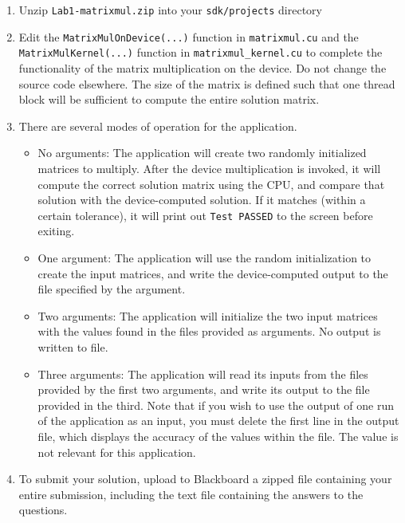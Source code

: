 \documentclass[11pt,oneside]{article}
\begin{document}
\begin{enumerate}

\item Unzip \texttt{Lab1-matrixmul.zip} into your \texttt{sdk/projects} directory


\item Edit the \texttt{MatrixMulOnDevice(...)} function in \texttt{matrixmul.cu} and the \texttt{MatrixMulKernel(...)} function in \texttt{matrixmul\_kernel.cu} to complete the functionality of the matrix multiplication on the device. Do not change the source code elsewhere. The size of the matrix is defined such that one thread block will be sufficient to compute the entire solution matrix.


\item There are several modes of operation for the application.  

\begin{itemize}

\item No arguments:  The application will create two randomly initialized matrices to multiply.  After the device multiplication is invoked, it will compute the correct solution matrix using the CPU, and compare that solution with the device-computed solution.  If it matches (within a certain tolerance), it will print out \texttt{Test PASSED} to the screen before exiting.


\item One argument:  The application will use the random initialization to    create the input matrices, and write the device-computed output to the file specified by the argument.  


\item Two arguments:  The application will initialize the two input matrices with the values found in the files provided as arguments.  No output is written to file.


\item Three arguments:  The application will read its inputs from the files provided by the first two arguments, and write its output to the file provided in the third. Note that if you wish to use the output of one run of the application as an input, you must delete the first line in the output file, which displays the accuracy of the values within the file. The value is not relevant for this application.


\end{itemize}


\item To submit your solution, upload to Blackboard a zipped file containing your entire submission, including the text file containing the answers to the questions.  


\end{enumerate}
\end{document}
